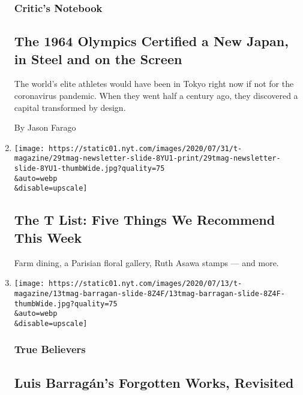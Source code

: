 \begin{enumerate}
  \hypertarget{critics-notebook}{%
  \subsubsection{Critic's Notebook}\label{critics-notebook}}

  \hypertarget{the-1964-olympics-certified-a-new-japan-in-steel-and-on-the-screen}{%
  \subsection{The 1964 Olympics Certified a New Japan, in Steel and on
  the
  Screen}\label{the-1964-olympics-certified-a-new-japan-in-steel-and-on-the-screen}}

  The world's elite athletes would have been in Tokyo right now if not
  for the coronavirus pandemic. When they went half a century ago, they
  discovered a capital transformed by design.

  By Jason Farago
\item
  \href{/2020/07/30/t-magazine/the-t-list-five-things-we-recommend-this-week.html}{}

  \texttt{[image: https://static01.nyt.com/images/2020/07/31/t-magazine/29tmag-newsletter-slide-8YU1-print/29tmag-newsletter-slide-8YU1-thumbWide.jpg?quality=75\\\&auto=webp\\\&disable=upscale]}

  \hypertarget{the-t-list-five-things-we-recommend-this-week}{%
  \subsection{The T List: Five Things We Recommend This
  Week}\label{the-t-list-five-things-we-recommend-this-week}}

  Farm dining, a Parisian floral gallery, Ruth Asawa stamps --- and
  more.
\item
  \href{/2020/07/24/t-magazine/luis-barragan.html}{}

  \texttt{[image: https://static01.nyt.com/images/2020/07/13/t-magazine/13tmag-barragan-slide-8Z4F/13tmag-barragan-slide-8Z4F-thumbWide.jpg?quality=75\\\&auto=webp\\\&disable=upscale]}

  \hypertarget{true-believers}{%
  \subsubsection{True Believers}\label{true-believers}}

  \hypertarget{luis-barraguxe1ns-forgotten-works-revisited}{%
  \subsection{Luis Barragán's Forgotten Works,
  Revisited}\label{luis-barraguxe1ns-forgotten-works-revisited}}


\end{enumerate}
